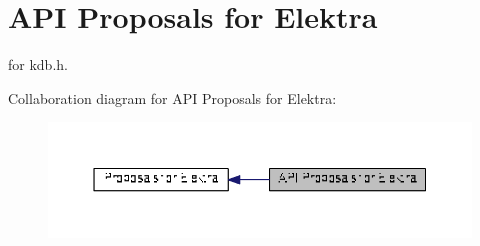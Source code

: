 \hypertarget{group__api}{\section{A\+P\+I Proposals for Elektra}
\label{group__api}
}


for kdb.\+h.  


Collaboration diagram for A\+P\+I Proposals for Elektra\+:
\nopagebreak
\begin{figure}[H]
\begin{center}
\leavevmode
\includegraphics[width=350pt]{group__api}
\end{center}
\end{figure}
